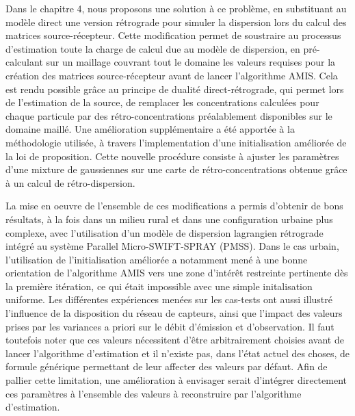 Dans le chapitre 4, nous proposons une solution à ce problème, en substituant au modèle direct une version rétrograde pour simuler la dispersion lors du calcul des matrices source-récepteur. Cette modification permet de soustraire au processus d'estimation toute la charge de calcul due au modèle de dispersion, en pré-calculant sur un maillage couvrant tout le domaine les valeurs requises pour la création des matrices source-récepteur avant de lancer l'algorithme AMIS. Cela est rendu possible grâce au principe de dualité direct-rétrograde, qui permet lors de l'estimation de la source, de remplacer les concentrations calculées pour chaque particule par des rétro-concentrations préalablement disponibles sur le domaine maillé. {Une amélioration supplémentaire a été apportée à la méthodologie utilisée, à travers l'implementation d'une initialisation améliorée de la loi de proposition. Cette nouvelle procédure consiste à ajuster les paramètres d'une mixture de gaussiennes sur une carte de rétro-concentrations obtenue grâce à un calcul de rétro-dispersion.}




La mise en oeuvre de l'ensemble de ces modifications a permis d'obtenir de bons résultats, à la fois dans un milieu rural et dans une configuration urbaine plus complexe, avec l'utilisation d'un modèle de dispersion lagrangien rétrograde intégré au système Parallel Micro-SWIFT-SPRAY (PMSS). {Dans le cas urbain, l'utilisation de l'initialisation améliorée a notamment mené à une bonne orientation de l'algorithme AMIS vers une zone d'intérêt restreinte pertinente dès la première itération, ce qui était impossible avec une simple initalisation uniforme.} Les différentes expériences menées sur les cas-tests ont aussi illustré l'influence de la disposition du réseau de capteurs, ainsi que l'impact des valeurs prises par les variances a priori sur le débit d'émission et d'observation. Il faut toutefois noter que ces valeurs nécessitent d'être arbitrairement choisies avant de lancer l'algorithme d'estimation et il n'existe pas, dans l'état actuel des choses, de formule générique permettant de leur affecter des valeurs par défaut. Afin de pallier cette limitation, une amélioration à envisager serait d'intégrer directement ces paramètres à l'ensemble des valeurs à reconstruire par l'algorithme d'estimation.

